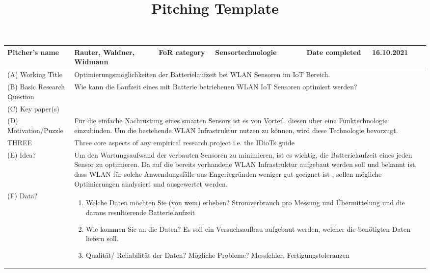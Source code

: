 \documentclass[10pt,table]{article}
\title{Pitching Template}
\date{}
\providecommand{\gercom}[1]{\glqq{}#1\grqq{}}
\providecommand{\lgc}{\cellcolor{lightgray}}
\begin{document}
\begin{center}
\begin{longtable}{p{4.5cm}p{4cm}p{2.5cm}p{4cm}p{2.5cm}p{3.5cm}}
\toprule
\lgc Pitcher's name & Rauter, Waldner, Widmann & \lgc FoR category & Sensortechnologie & \lgc Date completed & 16.10.2021\\
\midrule
\lgc (A) Working Title & \multicolumn{5}{p{18cm}}{Optimierungsmöglichkeiten der Batterielaufzeit bei WLAN Sensoren im IoT Bereich.} \\[1ex]
\lgc (B) Basic Research Question & \multicolumn{5}{p{18cm}}{Wie kann die Laufzeit eines mit Batterie betriebenen WLAN IoT Sensoren optimiert werden? } \\[1ex]
\lgc (C) Key paper(s) & \multicolumn{5}{p{18cm}}{\cite{mesquita_assessing_2018} \cite{montori_is_2017}} \\[1ex]
 \lgc (D) Motivation/Puzzle & \multicolumn{5}{p{18cm}}{ Für die einfache Nachrüstung eines smarten Sensors ist es von Vorteil, diesen über eine Funktechnologie einzubinden. Um die bestehende WLAN Infrastruktur nutzen zu können, wird diese Technologie bevorzugt.} \\[1ex]
\midrule
\lgc THREE  & \multicolumn{5}{p{18cm}}{\lgc Three core aspects of any empirical research project i.e. the \gercom{IDioTs} guide} \\
\midrule
\lgc  (E) Idea?& \multicolumn{5}{p{18cm}}{Um den Wartungsaufwand der verbauten Sensoren zu minimieren, ist es wichtig, die Batterielaufzeit eines jeden Sensor zu optimieren. Da auf die bereits vorhandene WLAN Infrastruktur aufgebaut werden soll und bekannt ist, dass WLAN für solche Anwendungsfälle aus Engeriegründen weniger gut geeignet ist \cite{thomas_optimizing_2016}, sollen mögliche Optimierungen analysiert und ausgewertet werden.} \\[1ex]
\lgc  (F) Data?& \multicolumn{5}{p{18cm}}{
 	\begin{enumerate}
 		\setlength\itemsep{.1ex}
 		\item Welche Daten möchten Sie (von wem) erheben?
 		\subitem Stromverbrauch pro Messung und Übermittelung und die daraus resultierende Batterielaufzeit
 		\item Wie kommen Sie an die Daten?
 		\subitem Es soll ein Versuchsaufbau aufgebaut werden, welcher die benötigten Daten liefern soll.
 		\item Qualität/ Reliabilität der Daten? Mögliche Probleme?
 		\subitem Messfehler, Fertigungstoleranzen
 	\end{enumerate}} \\[1ex]

\end{longtable}
\end{center}
\end{document}
